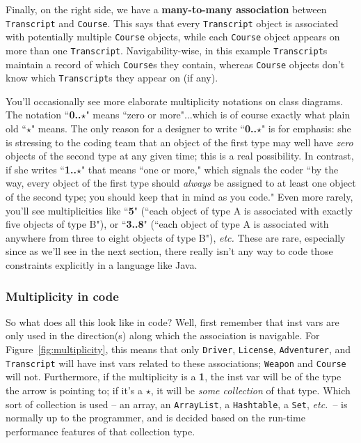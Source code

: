 Finally, on the right side, we have a \textbf{many-to-many association}
between \texttt{Tran\-script} and \texttt{Course}. This says that every
\texttt{Transcript} object is associated with potentially multiple
\texttt{Course} objects, while each \texttt{Course} object appears on more
than one \texttt{Transcript}. Navigability-wise, in this example
\texttt{Transcript}s maintain a record of which \texttt{Course}s they contain,
whereas \texttt{Course} objects don't know which \texttt{Transcript}s they
appear on (if any).

You'll occasionally see more elaborate multiplicity notations on class
diagrams. The notation ``\textbf{0..$\star$}" means ``zero or more"...which is
of course exactly what plain old ``$\star$" means. The only reason for a
designer to write ``\textbf{0..$\star$}" is for emphasis: she is stressing to
the coding team that an object of the first type may well have \textit{zero}
objects of the second type at any given time; this is a real possibility. In
contrast, if she writes ``\textbf{1..$\star$}" that means ``one or more,"
which signals the coder ``by the way, every object of the first type should
\textit{always} be assigned to at least one object of the second type; you
should keep that in mind as you code." Even more rarely, you'll see
multiplicities like ``\textbf{5}" (``each object of type A is associated with
exactly five objects of type B"), or ``\textbf{3..8}" (``each object of type A
is associated with anywhere from three to eight objects of type B"),
\textit{etc.} These are rare, especially since as we'll see in the next
section, there really isn't any way to code those constraints explicitly in a
language like Java.



\subsubsection{Multiplicity in code}

So what does all this look like in code? Well, first remember that inst vars
are only used in the direction(s) along which the association is navigable.
For Figure~\ref{fig:multiplicity}, this means that only \texttt{Driver},
\texttt{License}, \texttt{Adventurer}, and \texttt{Transcript} will have inst
vars related to these associations; \texttt{Weapon} and \texttt{Course} will
not. Furthermore, if the multiplicity is a \textbf{1}, the inst var will be of
the type the arrow is pointing to; if it's a $\star$, it will be \textit{some
collection} of that type. Which sort of collection is used -- an array, an
\texttt{ArrayList}, a \texttt{Hashtable}, a \texttt{Set}, \textit{etc.}~-- is
normally up to the programmer, and is decided based on the run-time
performance features of that collection type.

